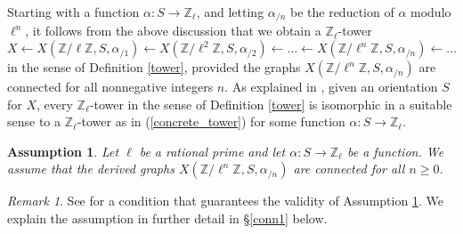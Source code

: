 \documentclass[11pt]{amsart}
\newtheorem{assumption}[theorem]{Assumption}
\numberwithin{equation}{section}
\theoremstyle{remark}
\newtheorem{remark}[theorem]{Remark}
\newcommand{\Z}{\mathbb{Z}}
\begin{document}
Starting with a function $\alpha:S \rightarrow \mathbb{Z}_{\ell}$, and letting $\alpha_{/n}$ be the reduction of $\alpha$ modulo $\ell^{n}$, it follows from the above discussion that we obtain a $\mathbb{Z}_{\ell}$-tower
\begin{equation} \label{concrete_tower}
X \leftarrow X(\mathbb{Z}/\ell\mathbb{Z},S,\alpha_{/1}) \leftarrow X(\mathbb{Z}/\ell^{2}\mathbb{Z},S,\alpha_{/2})\leftarrow \ldots \leftarrow X(\mathbb{Z}/\ell^{n}\mathbb{Z},S,\alpha_{/n}) \leftarrow \ldots 
\end{equation}
in the sense of Definition \ref{tower}, provided the graphs $X(\mathbb{Z}/\ell^{n}\mathbb{Z},S,\alpha_{/n})$ are connected for all nonnegative integers $n$.  As explained in \cite[Section 2.2]{DLRV}, given an orientation $S$ for $X$, every $\mathbb{Z}_{\ell}$-tower in the sense of Definition \ref{tower} is isomorphic in a suitable sense to a $\mathbb{Z}_{\ell}$-tower as in (\ref{concrete_tower}) for some function $\alpha:S\rightarrow \mathbb{Z}_{\ell}$.
\begin{assumption}\label{main assumption}
Let $\ell$ be a rational prime and let $\alpha: S\rightarrow \Z_\ell$ be a function. We assume that the derived graphs $X(\Z/\ell^n\mathbb{Z}, S, \alpha_{/n})$ are connected for all $n\geq 0$.
\end{assumption}
\begin{remark}
See \cite[Theorem 2.11]{DLRV} for a condition that guarantees the validity of Assumption \ref{main assumption}. We explain the assumption in further detail in \S \ref{conn1} below.
\end{remark}
\end{document}
